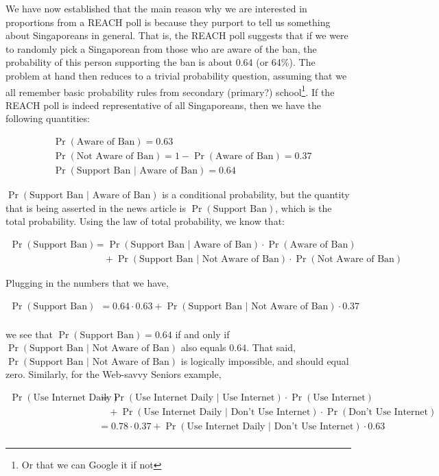 \documentclass[
  openany]{book}
\begin{document}
We have now established that the main reason why we are interested in proportions from a REACH poll is because they purport to tell us something about Singaporeans in general. That is, the REACH poll suggests that if we were to randomly pick a Singaporean from those who are aware of the ban, the probability of this person supporting the ban is about 0.64 (or 64\%). The problem at hand then reduces to a trivial probability question, assuming that we all remember basic probability rules from secondary (primary?) school\footnote{Or that we can Google it if not}. If the REACH poll is indeed representative of all Singaporeans, then we have the following quantities:

\[
\begin{aligned}
&\Pr(\text{Aware of Ban}) = 0.63 \\
&\Pr(\text{Not Aware of Ban}) = 1 - \Pr(\text{Aware of Ban}) = 0.37 \\
&\Pr(\text{Support Ban } | \text{ Aware of Ban}) = 0.64 
\end{aligned}
\]

\(\Pr(\text{Support Ban } | \text{ Aware of Ban})\) is a conditional probability, but the quantity that is being asserted in the news article is \(\Pr(\text{Support Ban})\), which is the total probability. Using the law of total probability, we know that:

\[
\begin{aligned}
\Pr(\text{Support Ban}) &= \Pr(\text{Support Ban } | \text{ Aware of Ban})\cdot \Pr(\text{Aware of Ban}) \\
& \quad + \Pr(\text{Support Ban } | \text{ Not Aware of Ban})\cdot \Pr(\text{Not Aware of Ban}) 
\end{aligned}
\]

Plugging in the numbers that we have,

\[
\begin{aligned}
\Pr(\text{Support Ban}) &= 0.64 \cdot 0.63 + \Pr(\text{Support Ban } | \text{ Not Aware of Ban}) \cdot 0.37 \\
\end{aligned}
\]

we see that \(\Pr(\text{Support Ban}) = 0.64\) if and only if \(\Pr(\text{Support Ban } | \text{ Not Aware of Ban})\) also equals \(0.64\). That said, \(\Pr(\text{Support Ban } | \text{ Not Aware of Ban})\) is logically impossible, and should equal zero. Similarly, for the Web-savvy Seniors example,

\[
\begin{aligned}
\Pr(\text{Use Internet Daily}) &= \Pr(\text{Use Internet Daily } | \text{ Use Internet})\cdot \Pr(\text{Use Internet}) \\
& \quad + \Pr(\text{Use Internet Daily } | \text{ Don't Use Internet})\cdot \Pr(\text{Don't Use Internet}) \\
&= 0.78 \cdot 0.37 + \Pr(\text{Use Internet Daily } | \text{ Don't Use Internet})\cdot 0.63 \\
\end{aligned}
\]
\end{document}
